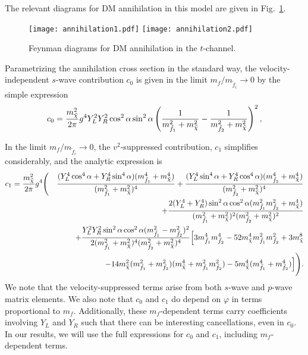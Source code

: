 \documentclass[11pt]{article}
\newcommand{\bea}{\begin{eqnarray}}
\newcommand{\eea}{\end{eqnarray}}
\begin{document}
The relevant diagrams for DM annihilation in this model are given in Fig.~\ref{feynanns}.
%
   \begin{figure}[t]
  \centering
  {\texttt{[image: annihilation1.pdf]}}\quad
  {\texttt{[image: annihilation2.pdf]}}
    \caption{Feynman diagrams for DM annihilation in the $t$-channel.}
    \label{feynanns}
\end{figure}
%
Parametrizing the annihilation cross section in the standard way, the velocity-independent $s$-wave contribution $c_0$ is given in the limit $m_{f}/m_{\tilde {f}_i} \to 0$ by the simple expression
%
\begin{equation}
c_0 = {m_{\tilde \chi}^2 \over 2 \pi } g^4  Y_L^2 Y_R^2 \cos^2 \alpha \sin ^2 \alpha \left( {1 \over m_{\tilde {f}_1}^2
+ m_{\tilde \chi}^2} -{1 \over m_{\tilde {f}_2}^2  + m_{\tilde \chi}^2} \right) ^2 ,
\label{annc0}
\end{equation}
%

In the limit $m_{f}/m_{\tilde {f}_i} \to 0$,  the $v^2$-suppressed contribution, $c_1$ simplifies considerably, and the analytic expression is
%
\bea
 c_1= { m_{\tilde \chi}^2 \over 2 \pi } g^4 &\Biggl(& {(Y_L^4 \cos ^4 \alpha +Y_R^4 \sin ^4 \alpha )(m_{\tilde {f}_1}^4
 + m_{\tilde \chi}^4)\over (m_{\tilde {f}_1}^2 + m_{\tilde \chi}^2)^4} + { (Y_L^4 \sin ^4 \alpha +Y_R^4 \cos ^4 \alpha ) (m_{\tilde {f}_2}^4
 + m_{\tilde \chi}^4)\over (m_{\tilde {f}_2}^2  + m_{\tilde \chi}^2)^4}
\nonumber \\  &&
+ { 2(Y_L^4 +Y_R^4  )\sin ^2 \alpha  \cos ^2 \alpha (m_{\tilde {f}_1}^2 m_{\tilde {f}_2}^2 + m_{\tilde \chi}^4)\over (m_{\tilde {f}_1}^2
+ m_{\tilde \chi}^2)^2 (m_{\tilde {f}_2}^2  + m_{\tilde \chi}^2)^2}
\nonumber \\  &&
+ { Y_L^2 Y_R^2  \sin ^2 \alpha  \cos ^2 \alpha(m_{\tilde {f}_1}^2 - m_{\tilde {f}_2}^2 )^2\over 2(m_{\tilde {f}_1}^2
+ m_{\tilde \chi}^2)^4 (m_{\tilde {f}_2}^2  + m_{\tilde \chi}^2)^4}
 \Bigl[ 3 m_{\tilde {f}_1}^4 m_{\tilde {f}_2}^4 - 52 m_{\tilde \chi}^4 m_{\tilde {f}_1}^2 m_{\tilde {f}_2}^2 + 3 m_{\tilde \chi}^8
\nonumber \\  &&
- 14m_{\tilde \chi}^2(m_{\tilde {f}_1}^2 + m_{\tilde {f}_2}^2)( m_{\tilde \chi}^4+ m_{\tilde {f}_1}^2 m_{\tilde {f}_2}^2)
-5m_{\tilde \chi}^4(m_{\tilde {f}_1}^4 + m_{\tilde {f}_2}^4)  \Bigr]
\Biggr) .
\label{annc1}
\eea
%
 We note that the velocity-suppressed terms arise from both $s$-wave and $p$-wave matrix elements. We also note that $c_0$ and $c_1$ do depend on $\varphi$ in terms proportional to $m_f$.  Additionally, these $m_f$-dependent terms carry coefficients involving $Y_L$ and $Y_R$ such that there can be interesting cancellations, even in $c_0$. In our results, we will use the full expressions for $c_0$ and $c_1$, including $m_f$-dependent terms.  
\end{document}

